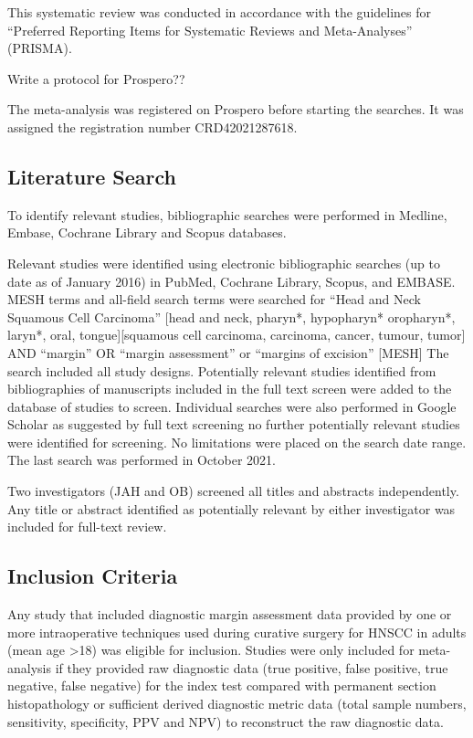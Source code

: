 
This systematic review was conducted in accordance with the guidelines for ``Preferred Reporting Items for Systematic Reviews and Meta-Analyses'' (PRISMA). %



Write a protocol for Prospero??

The meta-analysis was registered on Prospero before starting the searches. It was assigned the registration number CRD42021287618.

\subsection{Literature Search}

To identify relevant studies, bibliographic searches were performed in Medline, Embase, Cochrane Library and Scopus databases.

Relevant studies were identified using electronic bibliographic searches (up to date as of January 2016) in PubMed, Cochrane Library, Scopus, and EMBASE. 
MESH terms and all-field search terms were searched for ``Head and Neck Squamous Cell Carcinoma'' [head and neck, pharyn*, hypopharyn* oropharyn*, laryn*, oral, tongue][squamous cell carcinoma, carcinoma, cancer, tumour, tumor] AND ``margin'' OR ``margin assessment'' or ``margins of excision'' [MESH] %
The search included all study designs. 
Potentially relevant studies identified from bibliographies of manuscripts included in the full text screen were added to the database of studies to screen. 
Individual searches were also performed in Google Scholar as suggested by full text screening no further potentially relevant studies were identified for screening. 
No limitations were placed on the search date range. 
The last search was performed in October 2021.


Two investigators (JAH and OB) screened all titles and abstracts independently. Any title or abstract identified as potentially relevant by either investigator was included for full-text review. 


\subsection{Inclusion Criteria}

Any study that included diagnostic margin assessment data provided by one or more intraoperative techniques used during curative surgery for HNSCC in adults (mean age \textgreater 18) was eligible for inclusion.
Studies were only included for meta-analysis if they provided raw diagnostic data (true positive, false positive, true negative, false negative) for the index test compared with permanent section histopathology or sufficient derived diagnostic metric data (total sample numbers, sensitivity, specificity, PPV and NPV) to reconstruct the raw diagnostic data.

